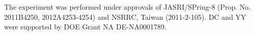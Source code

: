 \documentclass[twocolumn,showpacs,showkeys,fleqn,prl,superscriptaddress]{revtex4}%
\begin{document}
The experiment was performed under approvals of JASRI/SPring-8 (Prop. No. 2011B4250, 2012A4253-4254) and NSRRC, Taiwan (2011-2-105).
 DC and YY were supported by DOE Grant NA DE-NA0001789. 
       

%
%



\end{document}
